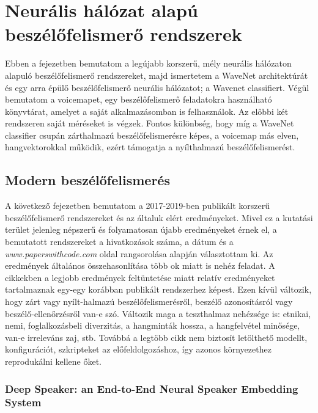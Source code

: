 \chapter{Neurális hálózat alapú beszélőfelismerő rendszerek}

Ebben a fejezetben bemutatom a legújabb korszerű, mély neurális hálózaton alapuló beszélőfelismerő rendszereket, majd ismertetem a WaveNet architektúrát és egy arra épülő beszélőfelismerő neurális hálózatot; a Wavenet classifiert. Végül bemutatom a voicemapet, egy beszélőfelismerő feladatokra használható könyvtárat, amelyet a saját alkalmazásomban is felhasználok. Az előbbi két rendszeren saját méréseket is végzek.
\newline
\newline
Fontos különbség, hogy míg a WaveNet classifier csupán zárthalmazú beszélőfelismerésre képes, a voicemap más elven, hangvektorokkal működik, ezért támogatja a nyílthalmazú beszélőfelismerést.

\section{Modern beszélőfelismerés}

A következő fejezetben bemutatom a 2017-2019-ben publikált korszerű beszélőfelismerő rendszereket és az általuk elért eredményeket. Mivel ez a kutatási terület jelenleg népszerű és folyamatosan újabb eredményeket érnek el, a bemutatott rendszereket a hivatkozások száma, a dátum és a \emph{www.paperswithcode.com} oldal rangsorolása alapján választottam ki.
\newline
\newline
Az eredmények általános összehasonlítása több ok miatt is nehéz feladat. A cikkekben a legjobb eredmények feltüntetése miatt relatív eredményeket tartalmaznak egy-egy korábban
publikált rendszerhez képest. Ezen kívül változik, hogy zárt vagy nyílt-halmazú beszélőfelismerésről, beszélő azonosításról vagy beszélő-ellenőrzésről van-e szó. Változik maga a teszthalmaz nehézsége is: etnikai, nemi, foglalkozásbeli diverzitás, a hangminták hossza, a hangfelvétel minősége, van-e irreleváns zaj, stb. Továbbá
a legtöbb cikk nem biztosít letölthető modellt, konfigurációt, szkripteket az előfeldolgozáshoz, így azonos környezethez reprodukálni kellene őket.


\subsection{Deep Speaker: an End-to-End Neural Speaker Embedding System}

